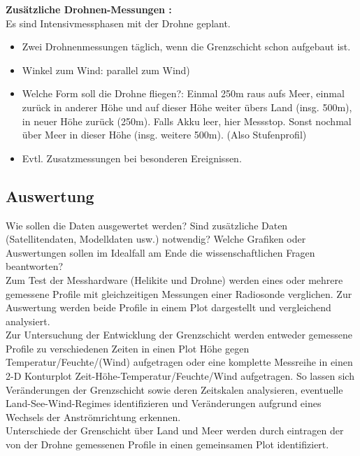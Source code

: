 \documentclass[a4paper,11pt,DIV=calc,tablecaptionabove,headinclude,twoside]{article}
\begin{document}
\textbf{Zusätzliche Drohnen-Messungen :}\\
Es sind Intensivmessphasen mit der Drohne geplant.
\begin{itemize}
\item Zwei Drohnenmessungen täglich, wenn die Grenzschicht schon aufgebaut ist.
\item Winkel zum Wind: parallel zum Wind)
\item Welche Form soll die Drohne fliegen?: Einmal 250m raus aufs Meer, einmal zurück in anderer Höhe und auf dieser Höhe weiter übers Land (insg. 500m), in neuer Höhe zurück (250m). Falls Akku leer, hier Messstop. Sonst nochmal über Meer in dieser Höhe (insg. weitere 500m). (Also Stufenprofil)
\item Evtl. Zusatzmessungen bei besonderen Ereignissen.
\end{itemize}
\subsection{Auswertung}
Wie sollen die Daten ausgewertet werden? Sind zusätzliche Daten (Satellitendaten, Modelldaten usw.) notwendig? Welche Grafiken oder Auswertungen sollen im Idealfall am Ende die wissenschaftlichen Fragen beantworten?\\
Zum Test der Messhardware (Helikite und Drohne) werden eines oder mehrere gemessene Profile 
mit gleichzeitigen Messungen einer Radiosonde verglichen. Zur Auswertung werden beide Profile
in einem Plot dargestellt und vergleichend analysiert.\\
Zur Untersuchung der Entwicklung der Grenzschicht werden entweder gemessene Profile zu verschiedenen 
Zeiten in einen Plot Höhe gegen Temperatur/Feuchte/(Wind) aufgetragen oder eine komplette Messreihe in einen 
2-D Konturplot Zeit-Höhe-Temperatur/Feuchte/Wind aufgetragen. So lassen sich Veränderungen der Grenzschicht sowie
deren Zeitskalen analysieren, eventuelle Land-See-Wind-Regimes identifizieren und Veränderungen aufgrund eines 
Wechsels der Anströmrichtung erkennen.\\
Unterschiede der Grenschicht über Land und Meer werden durch eintragen der von der Drohne gemessenen Profile 
in einen gemeinsamen Plot identifiziert.\\
\end{document}

